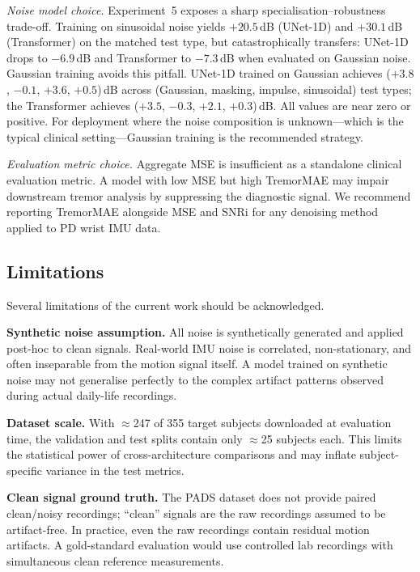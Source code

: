 \documentclass{article}
\begin{document}
\emph{Noise model choice.}
Experiment~5 exposes a sharp specialisation--robustness trade-off.
Training on sinusoidal noise yields $+20.5$\,dB (UNet-1D) and $+30.1$\,dB
(Transformer) on the matched test type, but catastrophically transfers:
UNet-1D drops to $-6.9$\,dB and Transformer to $-7.3$\,dB when evaluated on
Gaussian noise.
Gaussian training avoids this pitfall.
UNet-1D trained on Gaussian achieves ($+3.8$, $-0.1$, $+3.6$, $+0.5$)\,dB
across (Gaussian, masking, impulse, sinusoidal) test types; the Transformer
achieves ($+3.5$, $-0.3$, $+2.1$, $+0.3$)\,dB.
All values are near zero or positive.
For deployment where the noise composition is unknown---which is the typical
clinical setting---Gaussian training is the recommended strategy.

\emph{Evaluation metric choice.}
Aggregate MSE is insufficient as a standalone clinical evaluation metric.
A model with low MSE but high TremorMAE may impair downstream tremor analysis
by suppressing the diagnostic signal.
We recommend reporting TremorMAE alongside MSE and SNRi for any denoising
method applied to PD wrist IMU data.

\subsection{Limitations}

Several limitations of the current work should be acknowledged.

\textbf{Synthetic noise assumption.}
All noise is synthetically generated and applied post-hoc to clean signals.
Real-world IMU noise is correlated, non-stationary, and often inseparable
from the motion signal itself.
A model trained on synthetic noise may not generalise perfectly to the
complex artifact patterns observed during actual daily-life recordings.

\textbf{Dataset scale.}
With $\approx$247 of 355 target subjects downloaded at evaluation time, the
validation and test splits contain only $\approx$25 subjects each.
This limits the statistical power of cross-architecture comparisons and may
inflate subject-specific variance in the test metrics.

\textbf{Clean signal ground truth.}
The PADS dataset does not provide paired clean/noisy recordings; ``clean''
signals are the raw recordings assumed to be artifact-free.
In practice, even the raw recordings contain residual motion artifacts.
A gold-standard evaluation would use controlled lab recordings with
simultaneous clean reference measurements.
\end{document}
